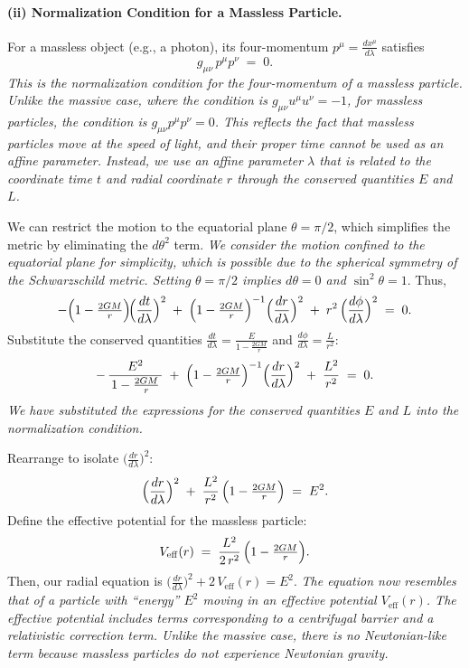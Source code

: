 \documentclass{article}
\begin{document}
\paragraph{(ii) Normalization Condition for a Massless Particle.}
For a massless object (e.g., a photon), its four-momentum \(p^\mu = \tfrac{dx^\mu}{d\lambda}\) satisfies
\begin{equation*}
g_{\mu\nu}\,p^\mu p^\nu \;=\; 0.
\end{equation*}
\textit{This is the normalization condition for the four-momentum of a massless particle. Unlike the massive case, where the condition is $g_{\mu\nu}u^\mu u^\nu = -1$, for massless particles, the condition is $g_{\mu\nu}p^\mu p^\nu = 0$. This reflects the fact that massless particles move at the speed of light, and their proper time cannot be used as an affine parameter. Instead, we use an affine parameter $\lambda$ that is related to the coordinate time $t$ and radial coordinate $r$ through the conserved quantities $E$ and $L$.}

We can restrict the motion to the equatorial plane \(\theta = \pi/2\), which simplifies the metric by eliminating the \(d\theta^2\) term. \textit{We consider the motion confined to the equatorial plane for simplicity, which is possible due to the spherical symmetry of the Schwarzschild metric. Setting $\theta = \pi/2$ implies $d\theta = 0$ and $\sin^2\theta = 1$}. Thus,
\begin{equation*}
-\Bigl(1 - \tfrac{2GM}{r}\Bigr)\!\Bigl(\frac{dt}{d\lambda}\Bigr)^2
\;+\;
\Bigl(1 - \tfrac{2GM}{r}\Bigr)^{-1}
\Bigl(\frac{dr}{d\lambda}\Bigr)^2
\;+\;
r^2\,\Bigl(\frac{d\phi}{d\lambda}\Bigr)^2
\;=\;
0.
\end{equation*}
Substitute the conserved quantities
\(\tfrac{dt}{d\lambda} = \tfrac{E}{1 - \tfrac{2GM}{r}}\) and \(\tfrac{d\phi}{d\lambda} = \tfrac{L}{r^2}\):
\begin{equation*}
-\,
\frac{E^2}{\,1 - \tfrac{2GM}{r}\,}
\;+\;
\Bigl(1 - \tfrac{2GM}{r}\Bigr)^{-1}
\Bigl(\frac{dr}{d\lambda}\Bigr)^2
\;+\;
\frac{L^2}{r^2}
\;=\; 0.
\end{equation*}
\textit{We have substituted the expressions for the conserved quantities $E$ and $L$ into the normalization condition.}

Rearrange to isolate \(\bigl(\tfrac{dr}{d\lambda}\bigr)^2\):
\begin{equation*}
\Bigl(\frac{dr}{d\lambda}\Bigr)^2
\;+\;
\frac{L^2}{r^2}\,\Bigl(1 - \tfrac{2GM}{r}\Bigr)
\;=\;
E^2.
\end{equation*}
Define the effective potential for the massless particle:
\begin{equation*}
V_\mathrm{eff}(r)
\;=\;
\frac{L^2}{2\,r^2}\,\Bigl(1 - \tfrac{2GM}{r}\Bigr).
\end{equation*}
Then, our radial equation is
\(
\bigl(\tfrac{dr}{d\lambda}\bigr)^2 + 2\,V_\mathrm{eff}(r) = E^2.
\)
\textit{The equation now resembles that of a particle with “energy” $E^2$ moving in an effective potential $V_{\text{eff}}(r)$. The effective potential includes terms corresponding to a centrifugal barrier and a relativistic correction term. Unlike the massive case, there is no Newtonian-like term because massless particles do not experience Newtonian gravity.}
\end{document}
